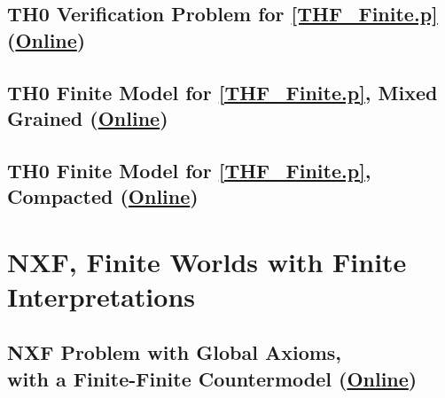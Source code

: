 \documentclass{easychair}
\begin{document}
\newpage
\subsection{TH0 Verification Problem for \ref{THF_Finite.p}
(\href{https://raw.githubusercontent.com/GeoffsPapers/InterpretationFormat/master/Examples/THF_Finite.s.p}{Online})}
\label{THF_Finite.s.p}
\begin{small}

\end{small}

\newpage
\subsection{TH0 Finite Model for \ref{THF_Finite.p}, Mixed Grained
(\href{https://raw.githubusercontent.com/GeoffsPapers/InterpretationFormat/master/Examples/THF_Finite_Medium.s}{Online})}
\label{THF_Finite_Medium.s}
\begin{small}

\end{small}

\newpage
\subsection{TH0 Finite Model for \ref{THF_Finite.p}, Compacted
(\href{https://raw.githubusercontent.com/GeoffsPapers/InterpretationFormat/master/Examples/THF_Finite_Compact.s}{Online})}
\label{THF_Finite_Compact.s}
\begin{small}

\end{small}

\newpage
\section{NXF, Finite Worlds with Finite Interpretations}
\label{NXF}

\subsection{NXF Problem with Global Axioms, \\ with a Finite-Finite Countermodel
(\href{https://raw.githubusercontent.com/GeoffsPapers/InterpretationFormat/master/Examples/NXF_Finite-Finite-Global.p}{Online})}
\label{NXF_Finite-Finite-Global.p}
\begin{small}

\end{small}
\end{document}
